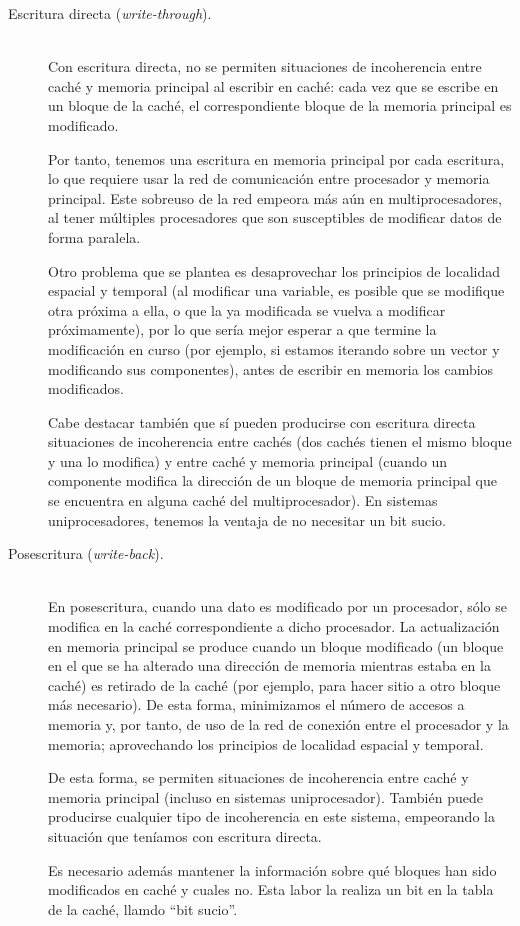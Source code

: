 \begin{description}
    \item [Escritura directa (\emph{write-through}).]~\\ 
        Con escritura directa, no se permiten situaciones de incoherencia entre caché y memoria principal al escribir en caché: cada vez que se escribe en un bloque de la caché, el correspondiente bloque de la memoria principal es modificado. 

        Por tanto, tenemos una escritura en memoria principal por cada escritura, lo que requiere usar la red de comunicación entre procesador y memoria principal. Este sobreuso de la red empeora más aún en multiprocesadores, al tener múltiples procesadores que son susceptibles de modificar datos de forma paralela.

        Otro problema que se plantea es desaprovechar los principios de localidad espacial y temporal (al modificar una variable, es posible que se modifique otra próxima a ella, o que la ya modificada se vuelva a modificar próximamente), por lo que sería mejor esperar a que termine la modificación en curso (por ejemplo, si estamos iterando sobre un vector y modificando sus componentes), antes de escribir en memoria los cambios modificados.

        Cabe destacar también que sí pueden producirse con escritura directa situaciones de incoherencia entre cachés (dos cachés tienen el mismo bloque y una lo modifica) y entre caché y memoria principal (cuando un componente modifica la dirección de un bloque de memoria principal que se encuentra en alguna caché del multiprocesador). En sistemas uniprocesadores, tenemos la ventaja de no necesitar un bit sucio.

    \item [Posescritura (\emph{write-back}).]~\\
        En posescritura, cuando una dato es modificado por un procesador, sólo se modifica en la caché correspondiente a dicho procesador. La actualización en memoria principal se produce cuando un bloque modificado (un bloque en el que se ha alterado una dirección de memoria mientras estaba en la caché) es retirado de la caché (por ejemplo, para hacer sitio a otro bloque más necesario). De esta forma, minimizamos el número de accesos a memoria y, por tanto, de uso de la red de conexión entre el procesador y la memoria; aprovechando los principios de localidad espacial y temporal.

        De esta forma, se permiten situaciones de incoherencia entre caché y memoria principal (incluso en sistemas uniprocesador). También puede producirse cualquier tipo de incoherencia en este sistema, empeorando la situación que teníamos con escritura directa.

        Es necesario además mantener la información sobre qué bloques han sido modificados en caché y cuales no. Esta labor la realiza un bit en la tabla de la caché, llamdo ``bit sucio''.
\end{description}
